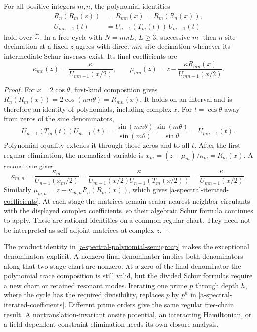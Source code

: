 \begin{theorem}
\label{a-spectral-semigroup-theorem}
For all positive integers $m,n$, the polynomial identities
\begin{align}
 R_n(R_m(x))&=R_{mn}(x)=R_m(R_n(x)),\nonumber\\
 U_{mn-1}(t)&=U_{n-1}(T_m(t))\,U_{m-1}(t)
 \label{a-spectral-polynomial-semigroup}
\end{align}
hold over $\mathbb C$. In a free cycle with $N=mnL$, $L\geq3$, successive
$m$- then $n$-site decimation at a fixed $z$ agrees with direct
$mn$-site decimation whenever its intermediate Schur inverses exist.
Its final coefficients are
\begin{equation}
 \kappa_{mn}(z)=\frac{\kappa}{U_{mn-1}(x/2)},\qquad
 \mu_{mn}(z)=z-\frac{\kappa R_{mn}(x)}{U_{mn-1}(x/2)}.
 \label{a-spectral-iterated-coefficients}
\end{equation}
\end{theorem}
\begin{proof}
For $x=2\cos\theta$, first-kind composition gives
$R_n(R_m(x))=2\cos(mn\theta)=R_{mn}(x)$.
It holds on an interval and is therefore an identity of polynomials,
including complex $x$. For $t=\cos\theta$ away from zeros of the sine
denominators,
\[
 U_{n-1}(T_m(t))U_{m-1}(t)
 =\frac{\sin(mn\theta)}{\sin(m\theta)}
       \frac{\sin(m\theta)}{\sin\theta}
 =U_{mn-1}(t).
\]
Polynomial equality extends it through those zeros and to all $t$.
After the first regular elimination, the normalized variable is
$x_m=(z-\mu_m)/\kappa_m=R_m(x)$. A second one gives
\[
 \kappa_{m,n}
 =\frac{\kappa_m}{U_{n-1}(x_m/2)}
 =\frac{\kappa}
   {U_{m-1}(x/2)U_{n-1}(T_m(x/2))}
 =\frac{\kappa}{U_{mn-1}(x/2)}.
\]
Similarly
$\mu_{m,n}=z-\kappa_{m,n}R_n(R_m(x))$, which gives
\eqref{a-spectral-iterated-coefficients}.
At each stage the matrices remain scalar nearest-neighbor circulants
with the displayed complex coefficients, so their algebraic Schur
formula continues to apply. These are rational identities on a common
regular chart. They need not be interpreted as self-adjoint matrices at
complex $z$.
\end{proof}

The product identity in \eqref{a-spectral-polynomial-semigroup} makes
the exceptional denominators explicit. A nonzero final denominator
implies both denominators along that two-stage chart are nonzero.
At a zero of the final denominator the polynomial trace composition
is still valid, but the divided Schur formulas require a new chart or
retained resonant modes. Iterating one prime $p$ through depth $h$,
where the cycle has the required divisibility, replaces $p$ by $p^h$
in \eqref{a-spectral-iterated-coefficients}. Different prime orders
give the same regular free-chain result. A nontranslation-invariant
onsite potential, an interacting Hamiltonian, or a field-dependent
constraint elimination needs its own closure analysis.

